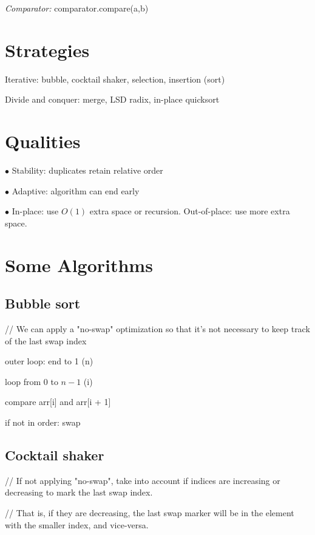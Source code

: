 \documentclass[english,openany]{book}
\begin{document}
    \textit{Comparator:} comparator.compare(a,b)\\

    \section{Strategies}

    Iterative: bubble, cocktail shaker, selection, insertion (sort)

    Divide and conquer: merge, LSD radix, in-place quicksort\\

    \section{Qualities}

    $\bullet$ Stability: duplicates retain relative order

    $\bullet$ Adaptive: algorithm can end early

    $\bullet$ In-place: use $O(1)$ extra space or recursion. Out-of-place: use more extra space.\\

    \section{Some Algorithms}

    \subsection{Bubble sort}

    // We can apply a "no-swap" optimization so that it's not necessary to keep track of the last swap index

    outer loop: end to 1 (n)

    \qquad loop from 0 to $n-1$ (i)

    \qquad compare arr[i] and arr[i + 1]

    \qquad if not in order: swap\\

    \subsection{Cocktail shaker}

    // If not applying "no-swap", take into account if indices are increasing or decreasing to mark the last swap index.

    // That is, if they are decreasing, the last swap marker will be in the element with the smaller index, and vice-versa.
\end{document}
